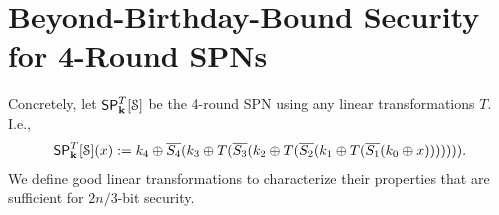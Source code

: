 
\section{Beyond-Birthday-Bound Security for 4-Round SPNs}
\label{section:security of 4-round SPNs}

Concretely, let $\mathsf{SP}_{\mathbf{k}}^T[\mathcal{S}]$ be the 4-round SPN using any linear transformations $T$. I.e.,
%
\begin{align}
\mathsf{SP}_{\mathbf{k}}^T[\mathcal{S}](x):=k_4\oplus\overline{S_4}(k_3\oplus T(\overline{S_3}(k_2\oplus T(\overline{S_2}(k_1\oplus T(\overline{S_1}(k_0\oplus x))))))).
\label{eq:defn-4-round-spn}
\end{align}
%
We define good linear transformations to characterize their properties that are sufficient for $2n/3$-bit security.


